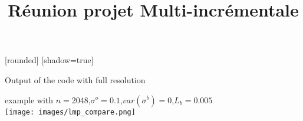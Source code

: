\documentclass[francais]{beamer}
\title[Nicolas Baillot d'Etivaux]{Réunion projet Multi-incrémentale}
\begin{document}
\usebackgroundtemplate{}

[rounded]%
[shadow=true]

\begin{frame}{Output of the code with full resolution}
\begin{center}
example with $n=2048$,$\sigma^o=0.1$,$var(\sigma^b)=0$,$L_b=0.005$\\
\texttt{[image: images/lmp\_compare.png]}
\end{center} 
\end{frame}
\end{document}

